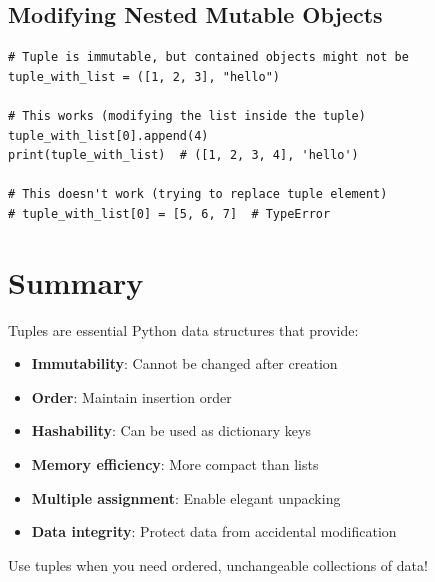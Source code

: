 \documentclass[12pt,a4paper]{article}
\begin{document}
\subsection{Modifying Nested Mutable Objects}

\begin{lstlisting}
# Tuple is immutable, but contained objects might not be
tuple_with_list = ([1, 2, 3], "hello")

# This works (modifying the list inside the tuple)
tuple_with_list[0].append(4)
print(tuple_with_list)  # ([1, 2, 3, 4], 'hello')

# This doesn't work (trying to replace tuple element)
# tuple_with_list[0] = [5, 6, 7]  # TypeError
\end{lstlisting}

\section{Summary}

Tuples are essential Python data structures that provide:
\begin{itemize}
    \item \textbf{Immutability}: Cannot be changed after creation
    \item \textbf{Order}: Maintain insertion order
    \item \textbf{Hashability}: Can be used as dictionary keys
    \item \textbf{Memory efficiency}: More compact than lists
    \item \textbf{Multiple assignment}: Enable elegant unpacking
    \item \textbf{Data integrity}: Protect data from accidental modification
\end{itemize}

Use tuples when you need ordered, unchangeable collections of data!
\end{document}
